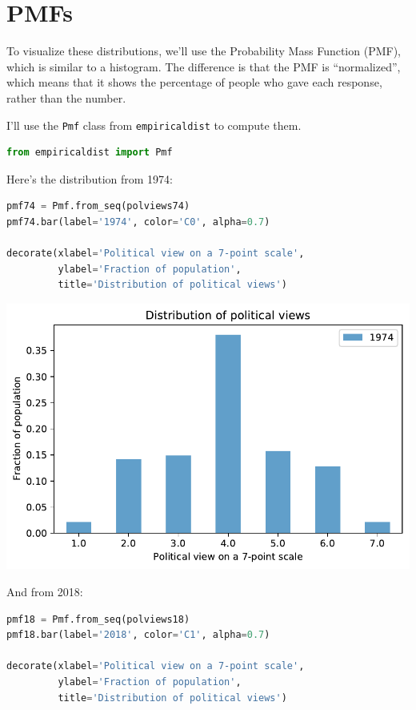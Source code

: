 \hypertarget{pmfs}{%
\section{PMFs}\label{pmfs}}

To visualize these distributions, we'll use the Probability Mass
Function (PMF), which is similar to a histogram. The difference is that
the PMF is ``normalized'', which means that it shows the percentage of
people who gave each response, rather than the number.

I'll use the \passthrough{\lstinline!Pmf!} class from
\passthrough{\lstinline!empiricaldist!} to compute them.

\begin{lstlisting}[language=Python,style=source]
from empiricaldist import Pmf
\end{lstlisting}

Here's the distribution from 1974:

\begin{lstlisting}[language=Python,style=source]
pmf74 = Pmf.from_seq(polviews74)
pmf74.bar(label='1974', color='C0', alpha=0.7)

decorate(xlabel='Political view on a 7-point scale',
         ylabel='Fraction of population',
         title='Distribution of political views')
\end{lstlisting}

\begin{center}
\includegraphics[scale=0.75]{02_polviews_files/02_polviews_30_0.pdf}
\end{center}

And from 2018:

\begin{lstlisting}[language=Python,style=source]
pmf18 = Pmf.from_seq(polviews18)
pmf18.bar(label='2018', color='C1', alpha=0.7)

decorate(xlabel='Political view on a 7-point scale',
         ylabel='Fraction of population',
         title='Distribution of political views')
\end{lstlisting}

